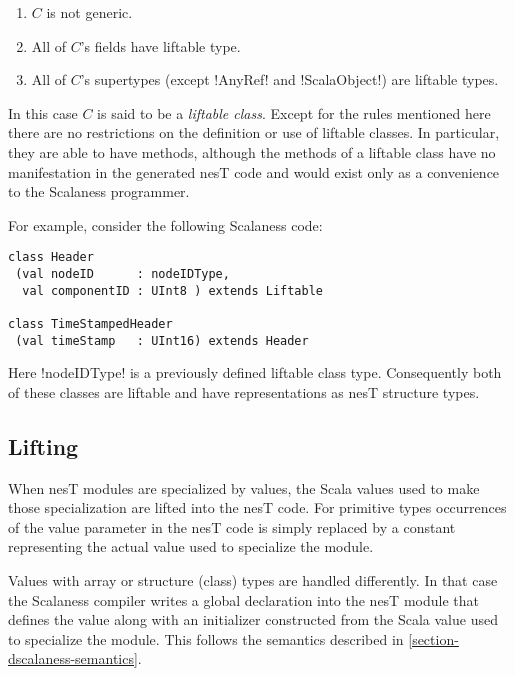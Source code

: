 \begin{enumerate}
\item $C$ is not generic.
\item All of $C$'s fields have liftable type.
\item All of $C$'s supertypes (except !AnyRef! and !ScalaObject!) are liftable types.
\end{enumerate}

In this case $C$ is said to be a \textit{liftable class}. Except for the rules mentioned here
there are no restrictions on the definition or use of liftable classes. In particular, they are
able to have methods, although the methods of a liftable class have no manifestation in the
generated nesT code and would exist only as a convenience to the Scalaness programmer.

For example, consider the following Scalaness code:

\singlespace
\vspace{1.0ex}
\begin{lstlisting}[language=scalaness]
class Header
 (val nodeID      : nodeIDType,
  val componentID : UInt8 ) extends Liftable

class TimeStampedHeader
 (val timeStamp   : UInt16) extends Header
\end{lstlisting}
\vspace{1.0ex}
\primaryspacing

Here !nodeIDType! is a previously defined liftable class type. Consequently both of these
classes are liftable and have representations as nesT structure types.


\subsection{Lifting}
\label{section-lifting}

When nesT modules are specialized by values, the Scala values used to make those specialization
are lifted into the nesT code. For primitive types occurrences of the value parameter in the
nesT code is simply replaced by a constant representing the actual value used to specialize the
module.

Values with array or structure (class) types are handled differently. In that case the Scalaness
compiler writes a global declaration into the nesT module that defines the value along with an
initializer constructed from the Scala value used to specialize the module. This follows the
semantics described in \autoref{section-dscalaness-semantics}.

